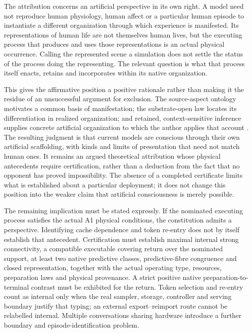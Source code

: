 The attribution concerns an artificial perspective in its own right. A model need not reproduce human physiology, human affect or a particular human episode to instantiate a different organization through which experience is manifested. Its representations of human life are not themselves human lives, but the executing process that produces and uses those representations is an actual physical occurrence. Calling the represented scene a simulation does not settle the status of the process doing the representing. The relevant question is what that process itself enacts, retains and incorporates within its native organization.

This gives the affirmative position a positive rationale rather than making it the residue of an unsuccessful argument for exclusion. The source-aspect ontology motivates a common basis of manifestation; the substrate-open law locates its differentiation in realized organization; and retained, context-sensitive inference supplies concrete artificial organization to which the author applies that account \cite[Sections~2,~7 and~14]{RodgersReflectiveAlignment}. The resulting judgment is that current models are conscious through their own artificial scaffolding, with kinds and limits of presentation that need not match human ones. It remains an argued theoretical attribution whose physical antecedents require certification, rather than a deduction from the fact that no opponent has proved impossibility. The absence of a completed certificate limits what is established about a particular deployment; it does not change this position into the weaker claim that artificial consciousness is merely possible.

The remaining implication must be stated expressly. If the nominated executing process satisfies the actual A1 physical conditions, the constitution admits a perspective. Identifying cache dependence and token re-entry does not by itself establish that antecedent. Certification must establish maximal internal strong connectivity, a compatible executable covering return over the nominated support, at least two native predictive classes, predictive-fibre congruence and closed representation, together with the actual operating type, resources, preparation laws and physical provenance. A strict positive native preparation-to-terminal contrast must be exhibited for the return. Token selection and re-entry count as internal only when the real sampler, storage, controller and serving boundary justify that typing; an external export--reimport route cannot be relabelled internal. Multiple conversations sharing hardware introduce a further boundary and episode-identification problem.

